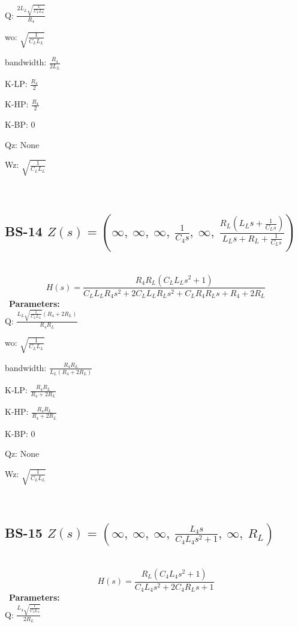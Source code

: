 \documentclass{article}
\begin{document}
Q: $\frac{2 L_{L} \sqrt{\frac{1}{C_{L} L_{L}}}}{R_{4}}$\ 

wo: $\sqrt{\frac{1}{C_{L} L_{L}}}$\ 

bandwidth: $\frac{R_{4}}{2 L_{L}}$\ 

K-LP: $\frac{R_{4}}{2}$\ 

K-HP: $\frac{R_{4}}{2}$\ 

K-BP: $0$\ 

Qz: $\text{None}$\ 

Wz: $\sqrt{\frac{1}{C_{L} L_{L}}}$\ 

\ 

\subsection{BS-14 $Z(s) = \left( \infty, \  \infty, \  \infty, \  \frac{1}{C_{4} s}, \  \infty, \  \frac{R_{L} \left(L_{L} s + \frac{1}{C_{L} s}\right)}{L_{L} s + R_{L} + \frac{1}{C_{L} s}}\right)$ } \ 
\textbf{\[H(s) = \frac{R_{4} R_{L} \left(C_{L} L_{L} s^{2} + 1\right)}{C_{L} L_{L} R_{4} s^{2} + 2 C_{L} L_{L} R_{L} s^{2} + C_{L} R_{4} R_{L} s + R_{4} + 2 R_{L}}\] } \ 
\textbf{Parameters:}\\ 

Q: $\frac{L_{L} \sqrt{\frac{1}{C_{L} L_{L}}} \left(R_{4} + 2 R_{L}\right)}{R_{4} R_{L}}$\ 

wo: $\sqrt{\frac{1}{C_{L} L_{L}}}$\ 

bandwidth: $\frac{R_{4} R_{L}}{L_{L} \left(R_{4} + 2 R_{L}\right)}$\ 

K-LP: $\frac{R_{4} R_{L}}{R_{4} + 2 R_{L}}$\ 

K-HP: $\frac{R_{4} R_{L}}{R_{4} + 2 R_{L}}$\ 

K-BP: $0$\ 

Qz: $\text{None}$\ 

Wz: $\sqrt{\frac{1}{C_{L} L_{L}}}$\ 

\ 

\subsection{BS-15 $Z(s) = \left( \infty, \  \infty, \  \infty, \  \frac{L_{4} s}{C_{4} L_{4} s^{2} + 1}, \  \infty, \  R_{L}\right)$ } \ 
\textbf{\[H(s) = \frac{R_{L} \left(C_{4} L_{4} s^{2} + 1\right)}{C_{4} L_{4} s^{2} + 2 C_{4} R_{L} s + 1}\] } \ 
\textbf{Parameters:}\\ 

Q: $\frac{L_{4} \sqrt{\frac{1}{C_{4} L_{4}}}}{2 R_{L}}$\ 
\end{document}

